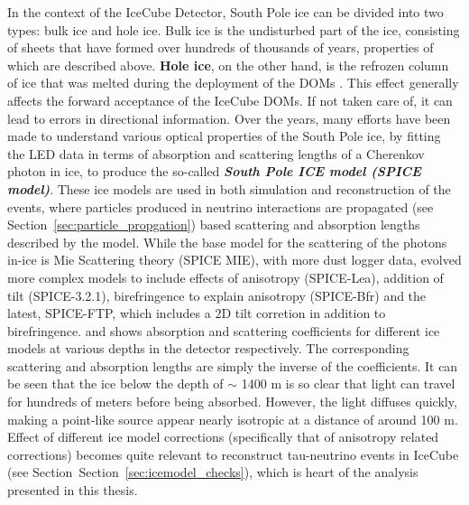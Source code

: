 In the context of the IceCube Detector, South Pole ice can be divided into two types: bulk ice and hole ice. Bulk ice is the undisturbed part of the ice, consisting of sheets that have formed over hundreds of thousands of years, properties of which are described above. \textbf{Hole ice}, on the other hand, is the refrozen column of ice that was melted during the deployment of the DOMs . This effect generally affects the forward acceptance of the IceCube DOMs. If not taken care of, it can lead to errors in directional information. Over the years, many efforts have been made to understand various optical properties of the South Pole ice, by fitting the LED data in terms of absorption and scattering lengths of a Cherenkov photon in ice, to produce the so-called \textbf{\emph{South Pole ICE model (SPICE model)}}. These ice models are used in both simulation and reconstruction of the events, where particles produced in neutrino interactions are propagated (see Section~\ref{sec:particle_propgation}) based scattering and absorption lengths described by the model. While the base model for the scattering of the photons in-ice is Mie Scattering theory \cite{miescattering} (SPICE MIE), with more dust logger data, evolved more complex models to include effects of anisotropy (SPICE-Lea), addition of tilt (SPICE-3.2.1), birefringence to explain anisotropy (SPICE-Bfr) and the latest, SPICE-FTP, which includes a 2D tilt corretion in addition to birefringence.  and  shows absorption and scattering coefficients for different ice models at various depths in the detector respectively. The corresponding scattering and absorption lengths are simply the inverse of the coefficients. It can be seen that the ice below the depth of $\sim$ 1400 m is so clear that light can travel for hundreds of meters before being absorbed. However, the light diffuses quickly, making a point-like source appear nearly isotropic at a distance of around 100 m. Effect of different ice model corrections (specifically that of anisotropy related corrections) becomes quite relevant to reconstruct tau-neutrino events in IceCube (see Section~Section~\ref{sec:icemodel_checks}), which is heart of the analysis presented in this thesis.


